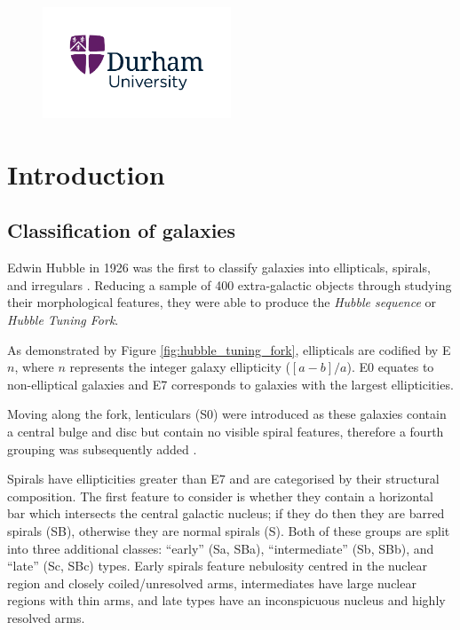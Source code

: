 \documentclass[12pt, twocolumn, nofootinbib]{revtex4-1}    %
\begin{document}
\begin{titlepage}
\begin{figure}[b]
\centering
\includegraphics[width=0.5\textwidth]{other/durham_university}
\end{figure}

\maketitle
\end{titlepage}


\null\newpage
\null\newpage
\tableofcontents
\newpage

\section{Introduction} 
\subsection{Classification of galaxies} \label{test}
\noindent
Edwin Hubble in 1926 was the first to classify galaxies into ellipticals, spirals, and irregulars \citep{1926ApJ....64..321H}. Reducing a sample of 400 extra-galactic objects through studying their morphological features, they were able to produce the \textit{Hubble sequence} or \textit{Hubble Tuning Fork}.

As demonstrated by Figure \ref{fig:hubble_tuning_fork}, ellipticals are codified by E$n$, where $n$ represents the integer galaxy ellipticity ($[a-b]/a$). E0 equates to non-elliptical galaxies and E7 corresponds to galaxies with the largest ellipticities. 

Moving along the fork, lenticulars (S0) were introduced as these galaxies contain a central bulge and disc but contain no visible spiral features, therefore a fourth grouping was subsequently added \citep{1961hag..book.....S, 1975gaun.book....1S, 1994cag..book.....S}. 

Spirals have ellipticities greater than E7 and are categorised by their structural composition. The first feature to consider is whether they contain a horizontal bar which intersects the central galactic nucleus; if they do then they are barred spirals (SB), otherwise they are normal spirals (S). Both of these groups are split into three additional classes: ``early'' (Sa, SBa), ``intermediate'' (Sb, SBb), and ``late'' (Sc, SBc) types. Early spirals feature nebulosity centred in the nuclear region and closely coiled/unresolved arms, intermediates have large nuclear regions with thin arms, and late types have an inconspicuous nucleus and highly resolved arms.  
\end{document}

